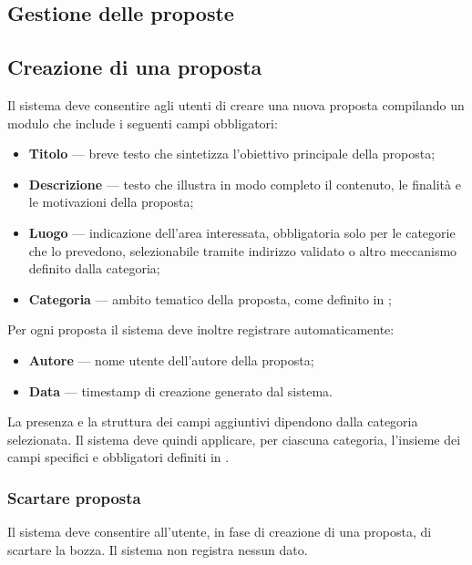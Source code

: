 \begin{rfscope}
\section{Gestione delle proposte}

\subsection{Creazione di una proposta} \label{rf:creazioneproposta}
Il sistema deve consentire agli utenti di creare una nuova proposta compilando un modulo che include i seguenti campi obbligatori:

\begin{itemize}
    \item \textbf{Titolo} — breve testo che sintetizza l’obiettivo principale della proposta;
    \item \textbf{Descrizione} — testo che illustra in modo completo il contenuto, le finalità e le motivazioni della proposta;
    \item \textbf{Luogo} — indicazione dell’area interessata, obbligatoria solo per le categorie che lo prevedono, selezionabile tramite indirizzo validato o altro meccanismo definito dalla categoria;
    \item \textbf{Categoria} — ambito tematico della proposta, come definito in ;
\end{itemize}

Per ogni proposta il sistema deve inoltre registrare automaticamente:

\begin{itemize}
    \item \textbf{Autore} — nome utente dell'autore della proposta;
    \item \textbf{Data} — timestamp di creazione generato dal sistema.
\end{itemize}

La presenza e la struttura dei campi aggiuntivi dipendono dalla categoria selezionata.
Il sistema deve quindi applicare, per ciascuna categoria, l’insieme dei campi specifici e obbligatori definiti in .

\subsubsection{Scartare proposta} \label{rf:scartarebozza}
Il sistema deve consentire all'utente, in fase di creazione di una proposta, di scartare la bozza. Il sistema non registra nessun dato.


\end{rfscope}
